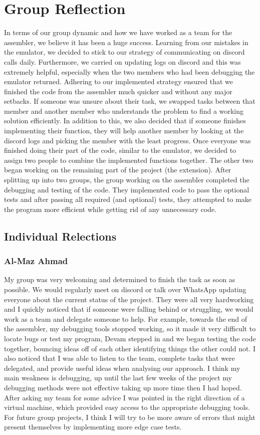 \documentclass[11pt]{article}
\begin{document}
\section{Group Reflection}
In terms of our group dynamic and how we have worked as a team for the assembler, we believe it has been a huge success. Learning from our mistakes in the emulator, we decided to stick to our strategy of communicating on discord calls daily. Furthermore, we carried on updating logs on discord and this was extremely helpful, especially when the two members who had been debugging the emulator returned. Adhering to our implemented strategy ensured that we finished the code from the assembler much quicker and without any major setbacks. If someone was unsure about their task, we swapped tasks between that member and another member who understands the problem to find a working solution efficiently. In addition to this, we also decided that if someone finishes implementing their function, they will help another member by looking at the discord logs and picking the member with the least progress. Once everyone was finished doing their part of the code, similar to the emulator, we decided to assign two people to combine the implemented functions together. The other two began working on the remaining part of the project (the extension). After splitting up into two groups, the group working on the assembler completed the debugging and testing of the code. They implemented code to pass the optional tests and after passing all required (and optional) tests, they attempted to make the program more efficient while getting rid of any unnecessary code.

\subsection{Individual Relections}
\subsubsection{Al-Maz Ahmad}
My group was very welcoming and determined to finish the task as soon as possible. We would regularly meet on discord or talk over WhatsApp updating everyone about the current status of the project. They were all very hardworking and I quickly noticed that if someone were falling behind or struggling, we would work as a team and delegate someone to help. For example, towards the end of the assembler, my debugging tools stopped working, so it made it very difficult to locate bugs or test my program, Devam stepped in and we began testing the code together, bouncing ideas off of each other identifying things the other could not. I also noticed that I was able to listen to the team, complete tasks that were delegated, and provide useful ideas when analysing our approach. I think my main weakness is debugging, up until the last few weeks of the project my debugging methods were not effective taking up more time then I had hoped. After asking my team for some advice I was pointed in the right direction of a virtual machine, which provided easy access to the appropriate debugging tools. For future group projects, I think I will try to be more aware of errors that might present themselves by implementing more edge case tests.
\end{document}
